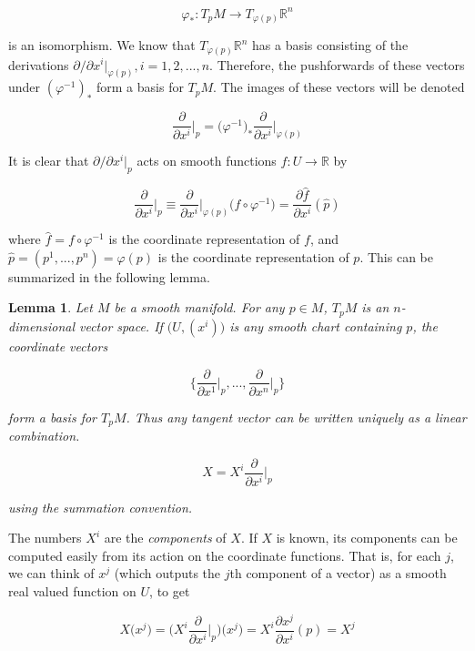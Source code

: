 \documentclass{article}
\newtheorem{lemma}[theorem]{Lemma}
\theoremstyle{remark}
\theoremstyle{definition}
\begin{document}
      \[\varphi_* : T_p M \longrightarrow T_{\varphi(p)} \mathbb{R}^n\]

    is an isomorphism. We know that $T_{\varphi(p)} \mathbb{R}^n$ has a basis consisting of the derivations $\partial /\partial x^i \big|_{\varphi(p)}, i = 1, 2, ..., n$. Therefore, the pushforwards of these vectors under $(\varphi^{-1})_*$ form a basis for $T_p M$. The images of these vectors will be denoted

      \[\frac{\partial}{\partial x^i} \bigg|_p = \big( \varphi^{-1} \big)_* \frac{\partial}{\partial x^i} \bigg|_{\varphi(p)}\]

    It is clear that $\partial / \partial x^i \big|_p $ acts on smooth functions $f: U \longrightarrow \mathbb{R}$ by

      \[\frac{\partial}{\partial x^i} \bigg|_p \equiv \frac{\partial}{\partial x^i} \bigg|_{\varphi(p)} \big( f \circ \varphi^{-1} \big) = \frac{\partial \hat{f}}{\partial x^i} (\hat{p})\]

    where $\hat{f} = f \circ \varphi^{-1}$ is the coordinate representation of $f$, and $\hat{p} = (p^1, ..., p^n) = \varphi(p)$ is the coordinate representation of $p$. This can be summarized in the following lemma. 

    \begin{lemma}
      Let $M$ be a smooth manifold. For any $p \in M$, $T_p M$ is an $n$-dimensional vector space. If $\big( U, (x^i)\big)$ is any smooth chart containing $p$, the coordinate vectors 

        \[\bigg\{ \frac{\partial}{\partial x^1} \bigg|_p, ..., \frac{\partial}{\partial x^n} \bigg|_p \bigg\}\]

      form a basis for $T_p M$. Thus any tangent vector can be written uniquely as a linear combination. 

        \[X = X^i \frac{\partial}{\partial x^i} \bigg|_p\]

      using the summation convention. 
    \end{lemma}

    The numbers $X^i$ are the \textit{components} of $X$. If $X$ is known, its components can be computed easily from its action on the coordinate functions. That is, for each $j$, we can think of $x^j$ (which outputs the $j$th component of a vector) as a smooth real valued function on $U$, to get

      \[X \big(x^j\big) = \bigg(X^i \frac{\partial}{\partial x^i} \bigg|_p \bigg) \big(x^j \big) = X^i \frac{\partial x^j}{\partial x^i} (p) = X^j\]
\end{document}
